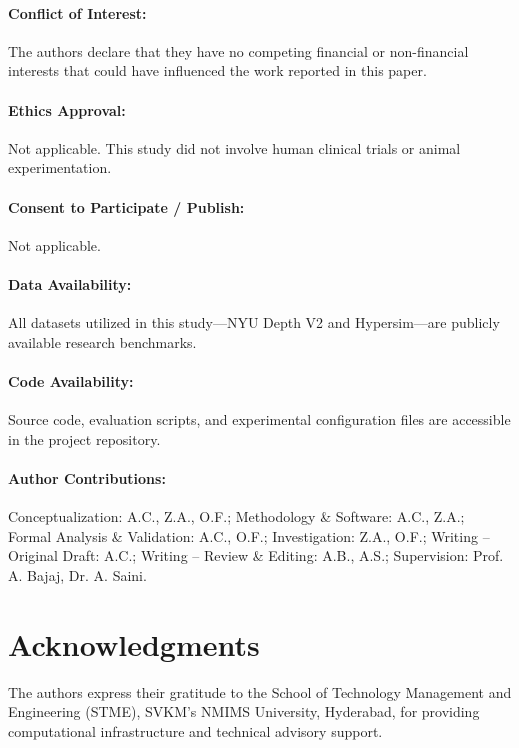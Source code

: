 \documentclass[11pt,a4paper]{article}
\begin{document}
\paragraph{Conflict of Interest:} The authors declare that they have no competing financial or non-financial interests that could have influenced the work reported in this paper.
\paragraph{Ethics Approval:} Not applicable. This study did not involve human clinical trials or animal experimentation.
\paragraph{Consent to Participate / Publish:} Not applicable.
\paragraph{Data Availability:} All datasets utilized in this study—NYU Depth V2 and Hypersim—are publicly available research benchmarks.
\paragraph{Code Availability:} Source code, evaluation scripts, and experimental configuration files are accessible in the project repository.
\paragraph{Author Contributions:} Conceptualization: A.C., Z.A., O.F.; Methodology \& Software: A.C., Z.A.; Formal Analysis \& Validation: A.C., O.F.; Investigation: Z.A., O.F.; Writing -- Original Draft: A.C.; Writing -- Review \& Editing: A.B., A.S.; Supervision: Prof. A. Bajaj, Dr. A. Saini.

\section*{Acknowledgments}
The authors express their gratitude to the School of Technology Management and Engineering (STME), SVKM's NMIMS University, Hyderabad, for providing computational infrastructure and technical advisory support.



\end{document}
